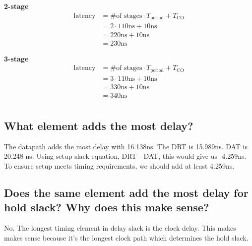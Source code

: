 \documentclass[12pt]{article}
\newenvironment{subquestion}[1]{\subsection{#1}
\begin{tcolorbox}[colback=blue!2!white,colframe=blue!20!white]}{\end{tcolorbox}}
\newcommand{\ns}{\text{ns}}
\begin{document}
        \begin{subquestion}{}
            \begin{description}
                \item \textbf{2-stage} \\
                    \begin{align*}
                        \text{latency} &= \text{\# of stages} \cdot T_{\text{period}} + T_{\text{CO}} \\
                        &= 2 \cdot 110\ns + 10 \ns \\
                        &= 220 \ns + 10 \ns \\
                        &= 230 \ns
                    \end{align*}
                \item \textbf{3-stage} \\
                    \begin{align*}
                        \text{latency} &= \text{\# of stages} \cdot T_{\text{period}} + T_{\text{CO}} \\
                        &= 3 \cdot 110\ns + 10 \ns \\
                        &= 330 \ns + 10 \ns \\
                        &= 340 \ns
                    \end{align*}
            \end{description}
        \end{subquestion}

    \section{}
        \begin{subquestion}{What element adds the most delay?}
            The datapath adds the most delay with 16.138ns. The DRT is 15.989ns. DAT is 20.248 ns. Using setup slack equation, DRT - DAT, this would give us -4.259ns. To ensure setup meets timing requirements, we should add at least 4.259ns.
        \end{subquestion}

        \begin{subquestion}{Does the same element add the most delay for hold slack? Why does this make sense?}
            No. The longest timing element in delay slack is the clock delay. This makes makes sense because it's the longest clock path which determines the hold slack.
        \end{subquestion}
\end{document}
